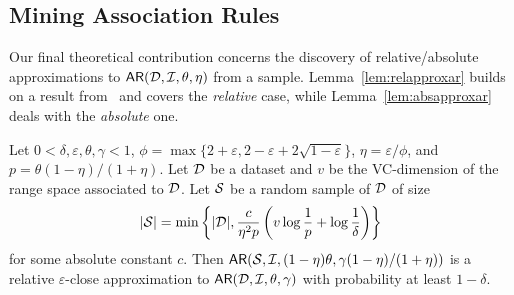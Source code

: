 \subsection{Mining Association Rules}\label{sec:vcmineminingar}
Our final theoretical contribution concerns the discovery of relative/absolute
approximations to $\mathsf{AR}({\cal D},{\cal I},\theta,\eta)$ from a sample.
Lemma~\ref{lem:relapproxar} builds on a result
from~\cite[Sect.~5]{ChakaravarthyPS09} and covers the \emph{relative} case,
while Lemma~\ref{lem:absapproxar} deals with the \emph{absolute} one.

\begin{lemma}\label{lem:relapproxar}
  Let $0<\delta,\varepsilon,\theta,\gamma<1$,
  $\phi=\max\{2+\varepsilon,2-\varepsilon+2\sqrt{1-\varepsilon}\}$,
  $\eta=\varepsilon/\phi$, and $p=\theta(1-\eta)/(1+\eta)$. Let
  ${\cal D}$ be a dataset %
  and $v$ be the VC-dimension of the range space associated to ${\cal D}$.
  Let ${\cal S}$ be a random sample of ${\cal D}$ of size 
  \begin{equation}\label{eq:vcminesamsizerelapproxar}
  |{\cal S}|=\min\left\{|{\cal D}|,\frac{c}{\eta^2p}\left(v\log\frac{1}{p}+\log\frac{1}{\delta}\right)\right\}
  \end{equation}
  for some absolute constant $c$. Then
  $\mathsf{AR}({\cal S},{\cal I},(1-\eta)\theta,\gamma(1-\eta)/(1+\eta))$
  is a relative $\varepsilon$-close approximation to
  $\mathsf{AR}({\cal D},{\cal I},\theta,\gamma)$ with probability at least $1-\delta$.
\end{lemma}

